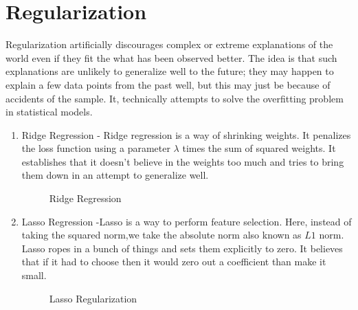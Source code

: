 \section{Regularization}
Regularization artificially discourages complex or extreme explanations of the world even if they fit the what has been observed better. The idea is that such explanations are unlikely to generalize well to the future; they may happen to explain a few data points from the past well, but this may just be because of accidents of the sample. It, technically attempts to solve the overfitting problem in statistical models.

\begin{enumerate}
\item{Ridge Regression -  Ridge regression is a way of shrinking weights. It penalizes the loss function using a parameter $\lambda$ times the sum of squared weights. It establishes that it doesn't believe in the weights too much and tries to bring them down in an attempt to generalize well. }
 \begin{figure}[h]
\centering
\caption{Ridge Regression}
{\setlength{\fboxsep}{20pt}
\setlength{\fboxrule}{1pt}
\textcolor{Magenta}{}
}
\end{figure} 
 
\newpage
\item{Lasso Regression -Lasso is a way to perform feature selection. Here, instead of taking the squared norm,we take the absolute norm also known as $L1$ norm. Lasso ropes in a bunch of things and sets them explicitly to zero. It believes that if it had to choose then it would zero out a coefficient than make it small. 
}

 \begin{figure}[h]
\centering
\caption{Lasso Regularization}
{\setlength{\fboxsep}{20pt}
\setlength{\fboxrule}{1pt}
\textcolor{cyan}{}
}
\end{figure} 
\end{enumerate}
